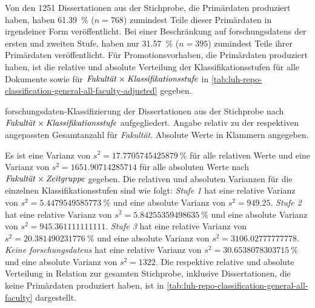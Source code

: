 Von den \num{1251} Dissertationen aus der Stichprobe, die Primärdaten produziert haben, haben \SI{61,39}{\percent} ($n=\num{768}$) zumindest Teile dieser Primärdaten in irgendeiner Form veröffentlicht.
Bei einer Beschränkung auf \glspl{forschungsdaten} der ersten und zweiten Stufe, haben nur \SI{31,57}{\percent} ($n=\num{395}$) zumindest Teile ihrer Primärdaten veröffentlicht.
Für Promotionsvorhaben, die Primärdaten produziert haben, ist die relative und absolute Verteilung der Klassifikationsstufen für alle Dokumente sowie für $\text{\textit{Fakultät}}\times\text{\textit{Klassifikationsstufe}}$ in \cref{tab:luh-repo-classification-general-all-faculty-adjusted} gegeben.
\begin{table}[!htbp]
	\caption{\gls{forschungsdaten}-Klassifizierung der Dissertationen aus der Stichprobe nach $\text{\textit{Fakultät}}\times\text{\textit{Klassifikationsstufe}}$ aufgegliedert.
    Angabe relativ zu der respektiven angepassten Gesamtanzahl für \textit{Fakultät}.
    Absolute Werte in Klammern angegeben.}
    
    \label{tab:luh-repo-classification-general-all-faculty-adjusted}
\end{table}
Es ist eine Varianz von $s^2=\SI[round-mode=places,round-precision=3]{17.7705745425879}{\percent}$ für alle relativen Werte und eine Varianz von $s^2=\num[round-mode=places,round-precision=3]{1651.90714285714}$ für alle absoluten Werte nach $\text{\textit{Fakultät}}\times\text{\textit{Zeitgruppe}}$ gegeben.
Die relativen und absoluten Varianzen für die einzelnen Klassifikationsstufen sind wie folgt:
\textit{Stufe 1} hat eine relative Varianz von $s^2=\SI[round-mode=places,round-precision=3]{5.4479549585773}{\percent}$ und eine absolute Varianz von $s^2=\num[round-mode=places,round-precision=3]{949.25}$.
\textit{Stufe 2} hat eine relative Varianz von $s^2=\SI[round-mode=places,round-precision=3]{5.84255359498635}{\percent}$ und eine absolute Varianz von $s^2=\num[round-mode=places,round-precision=3]{945.361111111111}$.
\textit{Stufe 3} hat eine relative Varianz von $s^2=\SI[round-mode=places,round-precision=3]{20.381490231776}{\percent}$ und eine absolute Varianz von $s^2=\num[round-mode=places,round-precision=3]{3106.02777777778}$.
\textit{Keine \glspl{forschungsdaten}} hat eine relative Varianz von $s^2=\SI[round-mode=places,round-precision=3]{30.6538078303715}{\percent}$ und eine absolute Varianz von $s^2=\num[round-mode=places,round-precision=3]{1322}$.
Die respektive relative und absolute Verteilung in Relation zur gesamten Stichprobe, inklusive Dissertationen, die keine Primärdaten produziert haben, ist in \cref{tab:luh-repo-classification-general-all-faculty} dargestellt.
